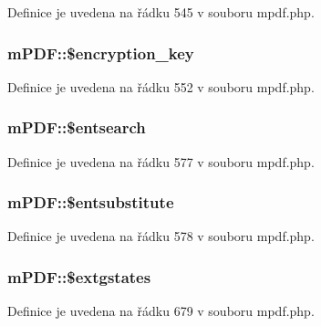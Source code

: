Definice je uvedena na řádku 545 v souboru mpdf.\-php.

\hypertarget{classm_p_d_f_ae6a6d3d1eba83d192b5a4cf260812bf1}{
\subsubsection[{\$encryption\-\_\-key}]{\setlength{\rightskip}{0pt plus 5cm}m\-P\-D\-F\-::\$encryption\-\_\-key}}\label{classm_p_d_f_ae6a6d3d1eba83d192b5a4cf260812bf1}


Definice je uvedena na řádku 552 v souboru mpdf.\-php.

\hypertarget{classm_p_d_f_a137d9e105addfbc0051b98e6b49603b7}{
\subsubsection[{\$entsearch}]{\setlength{\rightskip}{0pt plus 5cm}m\-P\-D\-F\-::\$entsearch}}\label{classm_p_d_f_a137d9e105addfbc0051b98e6b49603b7}


Definice je uvedena na řádku 577 v souboru mpdf.\-php.

\hypertarget{classm_p_d_f_a619915d7aa3f072d3de1ca8ea5a912e3}{
\subsubsection[{\$entsubstitute}]{\setlength{\rightskip}{0pt plus 5cm}m\-P\-D\-F\-::\$entsubstitute}}\label{classm_p_d_f_a619915d7aa3f072d3de1ca8ea5a912e3}


Definice je uvedena na řádku 578 v souboru mpdf.\-php.

\hypertarget{classm_p_d_f_abe6b86ee68a89dbd129eb3270b0c14af}{
\subsubsection[{\$extgstates}]{\setlength{\rightskip}{0pt plus 5cm}m\-P\-D\-F\-::\$extgstates}}\label{classm_p_d_f_abe6b86ee68a89dbd129eb3270b0c14af}


Definice je uvedena na řádku 679 v souboru mpdf.\-php.

